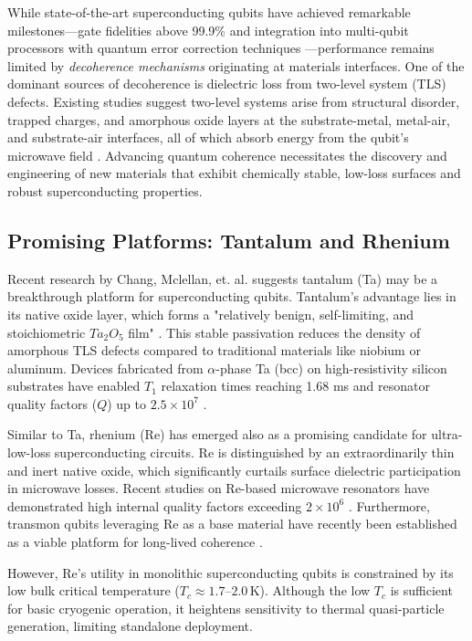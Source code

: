\documentclass[12pt]{article}
\begin{document}
While state-of-the-art superconducting qubits have achieved remarkable milestones---gate fidelities above 99.9\% and integration into multi-qubit processors with quantum error correction techniques \cite{marxer2025, acharya2025}---performance remains  limited by \textit{decoherence mechanisms} originating at materials interfaces. One of the dominant sources of decoherence is dielectric loss from two-level system (TLS) defects. Existing studies suggest two-level systems arise from structural disorder, trapped charges, and amorphous oxide layers at the substrate-metal, metal-air, and substrate-air interfaces, all of which absorb energy from the qubit's microwave field \cite{crowley2023, mclellan2023}. Advancing quantum coherence necessitates the discovery and engineering of new materials that exhibit chemically stable, low-loss surfaces and robust superconducting properties.

\subsection{Promising Platforms: Tantalum and Rhenium}
Recent research by Chang, Mclellan, et. al. suggests tantalum (Ta) may be a breakthrough platform for superconducting qubits. Tantalum's advantage lies in its native oxide layer, which forms a "relatively benign, self-limiting, and stoichiometric $Ta_2O_5$ film" \cite{mclellan2023}. This stable passivation reduces the density of amorphous TLS defects compared to traditional materials like niobium or aluminum. Devices fabricated from $\alpha$-phase Ta (bcc) on high-resistivity silicon substrates have enabled $T_1$ relaxation times reaching 1.68 ms and resonator quality factors ($Q$) up to $2.5 \times 10^7$ \cite{bland2025}.

Similar to Ta, rhenium (Re) has emerged also as a promising candidate for ultra-low-loss superconducting circuits. Re is distinguished by an extraordinarily thin and inert native oxide, which significantly curtails surface dielectric participation in microwave losses. Recent studies on Re-based microwave resonators have demonstrated high internal quality factors exceeding $2 \times 10^6$ \cite{crisa2025, ganjam2023}. Furthermore, transmon qubits leveraging Re as a base material have recently been established as a viable platform for long-lived coherence \cite{wang2026rhenium}. 

However, Re's utility in monolithic superconducting qubits is constrained by its low bulk critical temperature ($T_c \approx 1.7$--$2.0$\,K). Although the low $T_c$ is sufficient for basic cryogenic operation, it heightens sensitivity to thermal quasi-particle generation, limiting standalone deployment.
\end{document}
